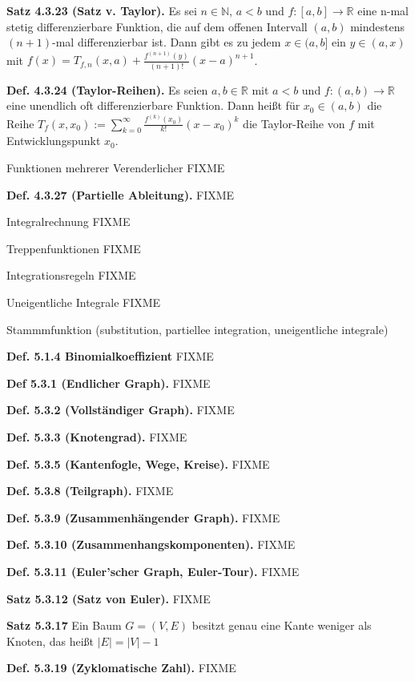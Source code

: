 \documentclass[ngerman]{article}
\begin{document}
\begin{multicols}{4}
\begin{tiny}
\textbf{Satz 4.3.23 (Satz v. Taylor).} Es sei $n\in\mathbb{N}$, $a<b$
und $f:[a,b]\rightarrow\mathbb{R}$ eine n-mal stetig differenzierbare
Funktion, die auf dem offenen Intervall $(a,b)$ mindestens $(n+1)$-mal
differenzierbar ist. Dann gibt es zu jedem $x\in(a,b]$ ein $y\in(a,x)$
mit $f(x)=T_{f,n}(x,a)+\frac{f^{(n+1)}(y)}{(n+1)!}(x-a)^{n+1}$.

\textbf{Def. 4.3.24 (Taylor-Reihen).} Es seien $a,b\in\mathbb{R}$
mit $a<b$ und $f:(a,b)\rightarrow\mathbb{R}$ eine unendlich oft
differenzierbare Funktion. Dann heißt für $x_{0}\in(a,b)$ die Reihe
$T_{f}(x,x_{0}):=\sum_{k=0}^{\infty}\frac{f^{(k)}(x_{0})}{k!}(x-x_{0})^{k}$
die Taylor-Reihe von $f$ mit Entwicklungspunkt $x_{0}$.

Funktionen mehrerer Verenderlicher FIXME

\textbf{Def. 4.3.27 (Partielle Ableitung).} FIXME

Integralrechnung FIXME

Treppenfunktionen FIXME

Integrationsregeln FIXME

Uneigentliche Integrale FIXME

Stammmfunktion (substitution, partiellee integration, uneigentliche integrale)

\textbf{Def. 5.1.4 Binomialkoeffizient} FIXME

\textbf{Def 5.3.1 (Endlicher Graph).} FIXME 

\textbf{Def. 5.3.2 (Vollständiger Graph).} FIXME

\textbf{Def. 5.3.3 (Knotengrad).} FIXME

\textbf{Def. 5.3.5 (Kantenfogle, Wege, Kreise).} FIXME

\textbf{Def. 5.3.8 (Teilgraph).} FIXME

\textbf{Def. 5.3.9 (Zusammenhängender Graph).} FIXME

\textbf{Def. 5.3.10 (Zusammenhangskomponenten).} FIXME

\textbf{Def. 5.3.11 (Euler\textquoteright{}scher Graph, Euler-Tour).} FIXME

\textbf{Satz 5.3.12 (Satz von Euler).} FIXME

\textbf{Satz 5.3.17} Ein Baum $G=(V,E)$ besitzt genau eine Kante
weniger als Knoten, das heißt $\vert E\vert=\vert V\vert-1$

\textbf{Def. 5.3.19 (Zyklomatische Zahl).} FIXME

\end{tiny}
\end{multicols}
\end{document}
